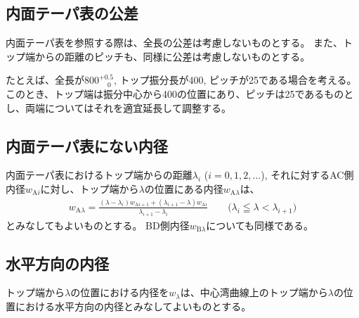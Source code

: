
\subsection{内面テーパ表の公差}
内面テーパ表を参照する際は、全長の公差は考慮しないものとする。
また、トップ端からの距離のピッチも、同様に公差は考慮しないものとする。

たとえば、全長が$800^{+0.5}_{\phantom -0}$, トップ振分長が400, ピッチが25である場合を考える。
このとき、トップ端は振分中心から400の位置にあり、ピッチは25であるものとし、両端についてはそれを適宜延長して調整する。

\subsection{内面テーパ表にない内径}
内面テーパ表におけるトップ端からの距離$\lambda_i$ ($i = 0, 1, 2, ...$), それに対するAC側内径$w_{\mathrm Ai}$に対し、トップ端から$\lambda$の位置にある内径$w_{\mathrm A\lambda}$は、
\begin{align*}
  w_{\mathrm A\lambda}
  = \frac{(\lambda-\lambda_i)w_{\mathrm Ai+1}+(\lambda_{i+1}-\lambda)w_{\mathrm Ai}}{\lambda_{i+1}-\lambda_i}
  \qquad
  \Big(\lambda_i \leqq \lambda < \lambda_{i+1}\Big)
\end{align*}
とみなしてもよいものとする。
BD側内径$w_{\mathrm B\lambda}$についても同様である。

\subsection{水平方向の内径}
トップ端から$\lambda$の位置における内径を$w_\lambda$は、中心湾曲線上のトップ端から$\lambda$の位置における水平方向の内径とみなしてよいものとする。

